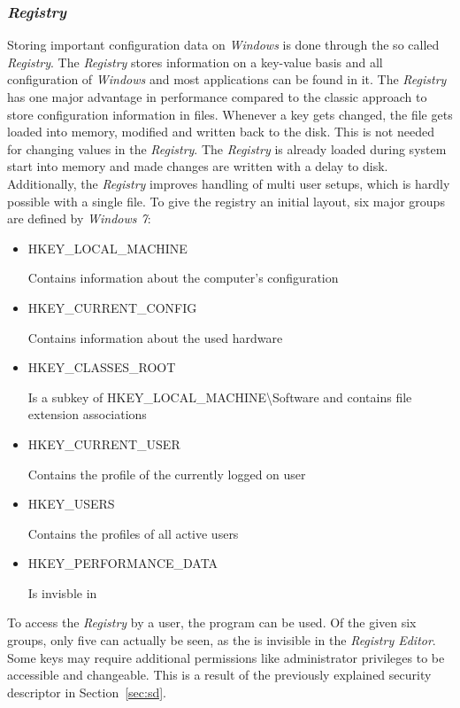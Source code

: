 \subsubsection{\emph{Registry}}
Storing important configuration data on \emph{Windows} is done through the so called \emph{Registry}. The \emph{Registry} stores information on a key-value basis and all configuration of \emph{Windows} and most applications can be found in it. The \emph{Registry} has one major advantage in performance compared to the classic approach to store configuration information in  files. Whenever a key gets changed, the  file gets loaded into memory, modified and written back to the disk. This is not needed for changing values in the \emph{Registry}. The \emph{Registry} is already loaded during system start into memory and made changes are written with a delay to disk. Additionally, the \emph{Registry} improves handling of multi user setups, which is hardly possible with a single  file. To give the registry an initial layout, six major groups are defined by \emph{Windows 7}:
\begin{itemize}
\label{sec:registrykeys}
\item HKEY\_LOCAL\_MACHINE

Contains information about the computer's configuration
\item HKEY\_CURRENT\_CONFIG

Contains information about the used hardware
\item HKEY\_CLASSES\_ROOT

Is a subkey of HKEY\_LOCAL\_MACHINE\textbackslash Software and contains file extension associations
\item HKEY\_CURRENT\_USER 

Contains the profile of the currently logged on user
\item HKEY\_USERS

Contains the profiles of all active users
\item HKEY\_PERFORMANCE\_DATA

Is invisble in 
\end{itemize}
To access the \emph{Registry} by a user, the  \cite{msdn_regedit} program can be used. Of the given six groups, only five can actually be seen, as the  is invisible in the \emph{Registry Editor}. Some keys may require additional permissions like administrator privileges to be accessible and changeable. This is a result of the previously explained security descriptor in Section~\ref{sec:sd}.